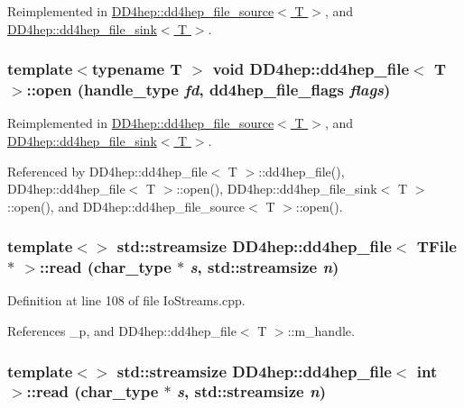 Reimplemented in \hyperlink{class_d_d4hep_1_1dd4hep__file__source_ac9d66c792e2fa69fa7c9df98d8d45850}{DD4hep::dd4hep\_\-file\_\-source$<$ T $>$}, and \hyperlink{class_d_d4hep_1_1dd4hep__file__sink_aae7af8ee1e98ae89b380ddf2dc3f51f9}{DD4hep::dd4hep\_\-file\_\-sink$<$ T $>$}.\hypertarget{class_d_d4hep_1_1dd4hep__file_a5f7da6679da9dbc31f37c85e51d7dd94}{
\subsubsection[{open}]{\setlength{\rightskip}{0pt plus 5cm}template$<$typename T $>$ void {\bf DD4hep::dd4hep\_\-file}$<$ {\bf T} $>$::open ({\bf handle\_\-type} {\em fd}, \/  {\bf dd4hep\_\-file\_\-flags} {\em flags})}}
\label{class_d_d4hep_1_1dd4hep__file_a5f7da6679da9dbc31f37c85e51d7dd94}


Reimplemented in \hyperlink{class_d_d4hep_1_1dd4hep__file__source_a367c212f20de3cfe79b5e69403a5a256}{DD4hep::dd4hep\_\-file\_\-source$<$ T $>$}, and \hyperlink{class_d_d4hep_1_1dd4hep__file__sink_a55c1fa794f9474e51d6489496843e358}{DD4hep::dd4hep\_\-file\_\-sink$<$ T $>$}.

Referenced by DD4hep::dd4hep\_\-file$<$ T $>$::dd4hep\_\-file(), DD4hep::dd4hep\_\-file$<$ T $>$::open(), DD4hep::dd4hep\_\-file\_\-sink$<$ T $>$::open(), and DD4hep::dd4hep\_\-file\_\-source$<$ T $>$::open().\hypertarget{class_d_d4hep_1_1dd4hep__file_a1a6c8a07e5820c20c8aa7b959dc51ff9}{
\subsubsection[{read}]{\setlength{\rightskip}{0pt plus 5cm}template$<$$>$ std::streamsize {\bf DD4hep::dd4hep\_\-file}$<$ TFile $\ast$ $>$::read ({\bf char\_\-type} $\ast$ {\em s}, \/  std::streamsize {\em n})}}
\label{class_d_d4hep_1_1dd4hep__file_a1a6c8a07e5820c20c8aa7b959dc51ff9}


Definition at line 108 of file IoStreams.cpp.

References \_\-p, and DD4hep::dd4hep\_\-file$<$ T $>$::m\_\-handle.\hypertarget{class_d_d4hep_1_1dd4hep__file_ad433ff99755cae5ecbab5be148948ce9}{
\subsubsection[{read}]{\setlength{\rightskip}{0pt plus 5cm}template$<$$>$ std::streamsize {\bf DD4hep::dd4hep\_\-file}$<$ int $>$::read ({\bf char\_\-type} $\ast$ {\em s}, \/  std::streamsize {\em n})}}
\label{class_d_d4hep_1_1dd4hep__file_ad433ff99755cae5ecbab5be148948ce9}



